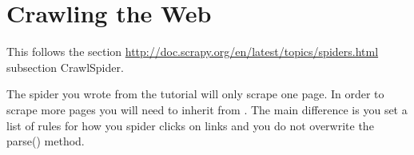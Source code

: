 \begin{comment}
Say we defined our items like so
\begin{lstlisting}
from scrapy.item import Item, Field

from scrapy.item import Item, Field

class SportscrapeItem(Item):
    names = Field()
    numbers = Field()
\end{lstlisting}

And we definded our spider like so.
\begin{lstlisting}
from scrapy.spider import BaseSpider
from scrapy.selector import HtmlXPathSelector

from tutorial.items import DmozItem

class DmozSpider(BaseSpider):
   name = "dmoz"
   allowed_domains = ["dmoz.org"]
   start_urls = [
       "http://www.dmoz.org/Computers/Programming/Languages/Python/Books/",
       "http://www.dmoz.org/Computers/Programming/Languages/Python/Resources/"
   ]

   def parse(self, response):
       hxs = HtmlXPathSelector(response)
       sites = hxs.select('//ul/li')
       items = []
       for site in sites:
           item = DmozItem()
           item['title'] = site.select('a/text()').extract()
           item['link'] = site.select('a/@href').extract()
           item['desc'] = site.select('text()').extract()
           items.append(item)
       return items
\end{lstlisting}

Then I would go to the top directory and run
\begin{lstlisting}
scrapy crawl dmoz -o items.json -t json
\end{lstlisting}
which will generate a file \li{items.json} where all the scraped items are serialized in JSON. You can also store them in csv or xml by changing all the json to csv or xml.

\end{comment}

\section*{Crawling the Web}
This follows the section \url{http://doc.scrapy.org/en/latest/topics/spiders.html} subsection CrawlSpider.

The spider you wrote from the tutorial will only scrape one page. In order to scrape more pages you will need to inherit from . The main difference is you set a list of rules for how you spider clicks on links and you do not overwrite the parse() method.

